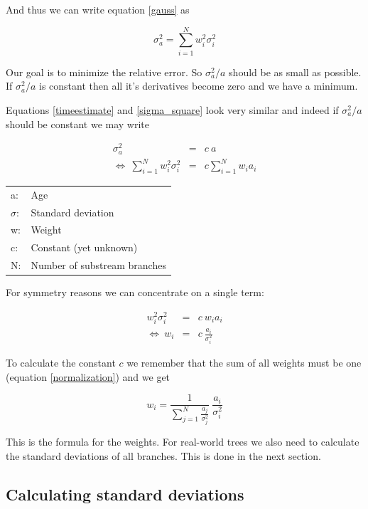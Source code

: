 And thus we can write equation \ref{gauss} as

\begin{equation}
\sigma_a^2 = \sum_{i = 1}^{N} w_i^2 \sigma_i^2 \label{sigma_square}
\end{equation}

Our goal is to minimize the relative error. So $\sigma_a^2/a$
should be as small as possible. If $\sigma_a^2/a$ is constant
then all it's derivatives become zero and we have a minimum.

Equations \ref{timeestimate} and \ref{sigma_square} look very
similar and indeed if $\sigma_a^2/a$ should be constant we may
write

\begin{eqnarray}
\sigma_a^2 & = & c\ a \\
\Leftrightarrow\ \sum_{i = 1}^{N} w_i^2 \sigma_i^2 & = & c \sum_{i = 1}^{N} w_i a_i
\end{eqnarray}

\begin{tabular}{ll}
a: &  Age\\
$\sigma$: &  Standard deviation\\
w: & Weight\\
c: & Constant (yet unknown)\\
N: & Number of substream branches
\end{tabular}
\vspace{1em}

For symmetry reasons we can concentrate on a single term:

\begin{eqnarray}
w_i^2 \sigma_i^2 & = & c\ w_i a_i\\
\Leftrightarrow\ w_i & = & c\ \frac{a_i}{\sigma_i^2}
\end{eqnarray}

To calculate the constant $c$ we remember that the sum of all
weights must be one (equation \ref{normalization}) and we get 

\begin{equation}
w_i = \frac{1}{\sum_{j=1}^{N}\frac{a_j}{\sigma_j^2}} \ \frac{a_i}{\sigma_i^2}
\end{equation}

This is the formula for the weights. For real-world trees we also
need to calculate the standard deviations of all branches.
This is done in the next section.


\subsection{Calculating standard deviations}


